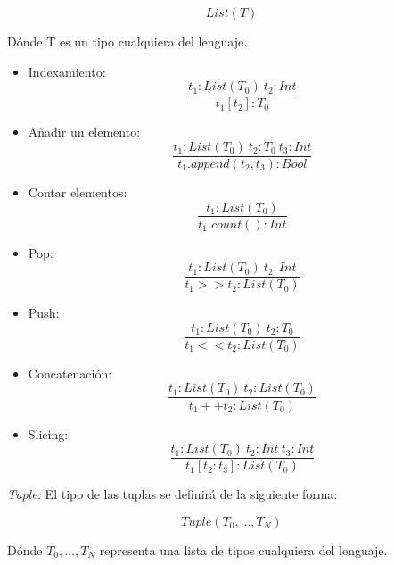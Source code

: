 \documentclass[12pt, spanish]{report}
\begin{document}
\begin{equation}
  List(T)
\end{equation}

D\'onde T es un tipo cualquiera del lenguaje.

\begin{itemize}
\item Indexamiento: 
  \begin{equation}
    \frac{t_1: List(T_0)\ t_2: Int}{t_1[t_2]: T_0}
  \end{equation}

\item Añadir un elemento: 
  \begin{equation}
    \frac{t_1: List(T_0)\ t_2: T_0\ t_3: Int}{t_1.append(t_2, t_3): Bool}
  \end{equation}

\item Contar elementos:
  \begin{equation}
    \frac{t_1: List(T_0)}{t_1.count(): Int}
  \end{equation}

\item Pop:
  \begin{equation}
    \frac{t_1: List(T_0)\ t_2: Int}{t_1 >> t_2: List(T_0)}
  \end{equation}

\item Push:
  \begin{equation}
    \frac{t_1: List(T_0)\ t_2: T_0}{t_1 < < t_2: List(T_0)}
  \end{equation}

\item Concatenaci\'on:
  \begin{equation}
    \frac{t_1: List(T_0)\ t_2: List(T_0)}{t_1 ++ t_2: List(T_0)}
  \end{equation}

\item Slicing:
  \begin{equation}
    \frac{t_1: List(T_0)\ t_2: Int\ t_3: Int}{t_1[t_2:t_3]: List(T_0)}
  \end{equation}
\end{itemize}

\emph{Tuple:}
El tipo de las tuplas se definir\'a de la siguiente forma:

\begin{equation}
  Tuple(T_0, ..., T_N)
\end{equation}

D\'onde $T_0, ..., T_N$ representa una lista de tipos cualquiera del
lenguaje.
\end{document}
